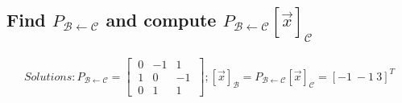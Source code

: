 \documentclass[../main.tex]{subfiles}
\begin{document}
\subsection{Find $P_{\mathcal{B} \leftarrow \mathcal{C}}$ and compute $P_{\mathcal{B} \leftarrow \mathcal{C}}[\vec{x}]_{\mathcal{C}}$}
\begin{align*}
        \boxed{
        Solutions: P_{\mathcal{B} \leftarrow \mathcal{C}} =
        \begin{bmatrix}
                \ 0 & -1 & 1 \  \\
                \ 1 & 0  & -1 \ \\
                \ 0 & 1  & 1  \
        \end{bmatrix}; [\vec{x}]_\mathcal{B} = P_{\mathcal{B} \leftarrow \mathcal{C}}[\vec{x}]_{\mathcal{C}} = [-1 \ -1 \ 3]^T
                }
\end{align*}
\end{document}
